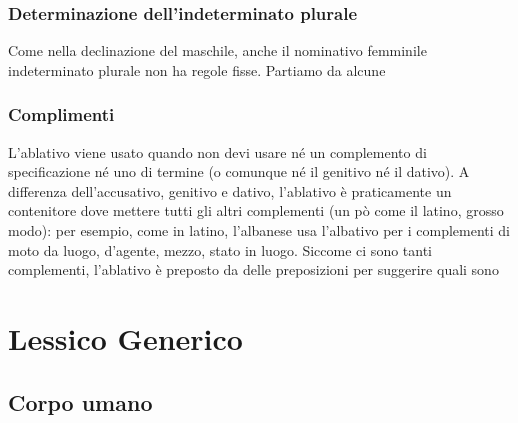 \subsection{Determinazione dell'indeterminato plurale}

Come nella declinazione del maschile, anche il nominativo femminile indeterminato plurale non ha regole fisse. Partiamo da alcune 

\subsection{Complimenti}

L'ablativo viene usato quando non devi usare né un complemento di specificazione né uno di termine (o comunque né il genitivo né il dativo)\cite{vocedellaquila:ablativo}.
A differenza dell'accusativo, genitivo e dativo, l'ablativo è praticamente un contenitore dove mettere tutti gli altri complementi (un pò come il latino, grosso modo): per esempio, come in latino, l'albanese usa l'albativo per i complementi di moto da luogo, d'agente, mezzo, stato in luogo.
Siccome ci sono tanti complementi, l'ablativo è preposto da delle preposizioni per suggerire quali sono   



\chapter{Lessico Generico}

\section{Corpo umano}

